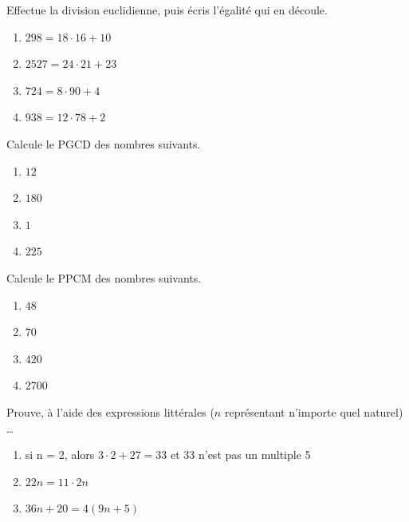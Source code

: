 \documentclass[12pt,parskip=half-, twoside=semi]{scrartcl}
\begin{document}
  \begin{exercise}
    Effectue la division euclidienne, puis écris l'égalité qui en découle. 
      \begin{enumerate}[cols=2]
        \item $298 = 18 \cdot 16 + 10$
        \item $2527 = 24 \cdot 21 + 23$
        \item $724 = 8 \cdot 90 + 4$
        \item $ 938 = 12 \cdot 78 + 2$
      \end{enumerate}
  \end{exercise}
  
  \begin{exercise}
    Calcule le PGCD des nombres suivants. 
      \begin{enumerate}[cols=2]
        \item $12$
        \item $180$
        \item $1$
        \item $225$
      \end{enumerate}
  \end{exercise}
  
  \begin{exercise}
    Calcule le PPCM des nombres suivants.
      \begin{enumerate}[cols=2]
        \item $48$
        \item $70$
        \item $420$
        \item $2700$
      \end{enumerate}
  \end{exercise}
  
  \begin{exercise}
    Prouve, à l'aide des expressions littérales (\(n\) représentant n'importe quel naturel) \dots 
    \begin{enumerate}
      \item si n = 2, alors \(3 \cdot 2 + 27 = 33\) et 33 n'est pas un multiple 5 
      \item \(22n = 11 \cdot 2n\) 
      \item \(36n+20 = 4 (9n+5)\)
    \end{enumerate}
  \end{exercise}
      
  

\newpage
\end{document}
